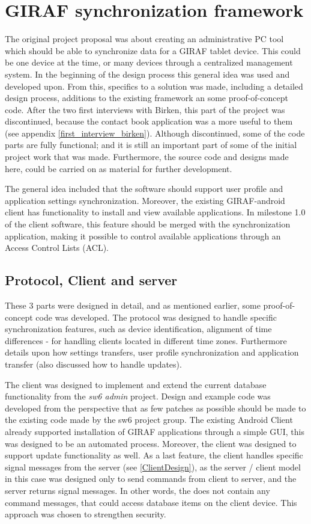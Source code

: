 \section{GIRAF synchronization framework}
The original project proposal was about creating an administrative PC tool which should be able to synchronize data for a GIRAF tablet device. This could be one device at the time, or many devices through a centralized management system. In the beginning of the design process this general idea was used and developed upon. From this, specifics to a solution was made, including a detailed design process, additions to the existing framework an some proof-of-concept code. After the two first interviews with Birken, this part of the project was discontinued, because the contact book application was a more useful to them (see appendix \vref{first_interview_birken}). Although discontinued, some of the code parts are fully functional; and it is still an important part of some of the initial project work that was made. Furthermore, the source code and designs made here, could be carried on as material for further development. 

The general idea included that the software should support user profile and application settings synchronization. Moreover, the existing GIRAF-android client has functionality to install and view available applications. In milestone 1.0 of the client software, this feature should be merged with the synchronization application, making it possible to control available applications through an Access Control Lists (ACL).

\subsection{Protocol, Client and server}
These 3 parts were designed in detail, and as mentioned earlier, some proof-of-concept code was developed. The protocol was designed to handle specific synchronization features, such as device identification, alignment of time differences - for handling clients located in different time zones. Furthermore details upon how settings transfers, user profile synchronization and application transfer (also discussed how to handle updates).  

The client was designed to implement and extend the current database functionality from the \emph{sw6 admin} project. Design and example code was developed from the perspective that as few patches as possible should be made to the existing code made by the sw6 project group.
The existing Android Client already supported installation of GIRAF applications through a simple GUI, this  was designed to be an automated process. Moreover, the client was designed to support update functionality as well. As a last feature, the client handles specific signal messages from the server (see \vref{ClientDesign}), as the server / client model in this case was designed only to send commands from client to server, and the server returns signal messages. In other words, the does not contain any command messages, that could access database items on the client device. This approach was chosen to strengthen security.  

